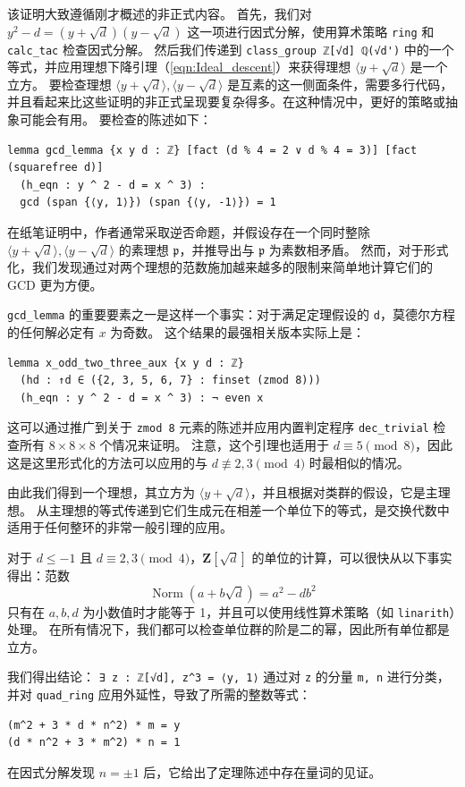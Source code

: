 \documentclass[sigplan,10pt,nonacm,
screen]{acmart} \settopmatter{printfolios=true,printccs=false,printacmref=false}
\newcommand{\ZZ}{\mathbf{Z}}
\DeclareMathOperator{\Norm}{Norm}
\begin{document}
该证明大致遵循刚才概述的非正式内容。
首先，我们对 $y^2 - d = (y + \sqrt{d})(y - \sqrt d)$ 这一项进行因式分解，使用算术策略 \lstinline{ring} 和 \lstinline{calc_tac} 检查因式分解。
%
然后我们传递到 \lstinline{class_group ℤ[√d] ℚ(√d')} 中的一个等式，并应用理想下降引理（\ref{eqn:Ideal_descent}）来获得理想 $\langle y + \sqrt{d} \rangle$ 是一个立方。
要检查理想 $\langle y + \sqrt{d} \rangle,\langle y - \sqrt{d} \rangle$ 是互素的这一侧面条件，需要多行代码，并且看起来比这些证明的非正式呈现要复杂得多。在这种情况中，更好的策略或抽象可能会有用。
要检查的陈述如下：
\begin{lstlisting}
lemma gcd_lemma {x y d : ℤ} [fact (d % 4 = 2 ∨ d % 4 = 3)] [fact (squarefree d)]
  (h_eqn : y ^ 2 - d = x ^ 3) :
  gcd (span {⟨y, 1⟩}) (span {⟨y, -1⟩}) = 1
\end{lstlisting}
在纸笔证明中，作者通常采取逆否命题，并假设存在一个同时整除 $\langle y + \sqrt{d} \rangle,\langle y - \sqrt{d} \rangle$ 的素理想 $\mathfrak p$，并推导出与 $\mathfrak p$ 为素数相矛盾。
然而，对于形式化，我们发现通过对两个理想的范数施加越来越多的限制来简单地计算它们的 GCD 更为方便。

\lstinline{gcd_lemma} 的重要要素之一是这样一个事实：对于满足定理假设的 \lstinline{d}，莫德尔方程的任何解必定有 $x$ 为奇数。
这个结果的最强相关版本实际上是：
\begin{lstlisting}
lemma x_odd_two_three_aux {x y d : ℤ}
  (hd : ↑d ∈ ({2, 3, 5, 6, 7} : finset (zmod 8)))
  (h_eqn : y ^ 2 - d = x ^ 3) : ¬ even x
\end{lstlisting}
这可以通过推广到关于 \lstinline{zmod 8} 元素的陈述并应用内置判定程序 \lstinline{dec_trivial} 检查所有 $8 \times 8 \times 8$ 个情况来证明。
注意，这个引理也适用于 $d \equiv 5 \pmod 8$，因此这是这里形式化的方法可以应用的与 $d \not\equiv 2,3\pmod 4$ 时最相似的情况。

由此我们得到一个理想，其立方为 $\langle y + \sqrt{d} \rangle$，并且根据对类群的假设，它是主理想。
从主理想的等式传递到它们生成元在相差一个单位下的等式，是交换代数中适用于任何整环的非常一般引理的应用。

对于 $d \le -1$ 且 $d\equiv 2,3\pmod 4$，$\ZZ[\sqrt d]$ 的单位的计算，可以很快从以下事实得出：范数
$$\Norm(a+b \sqrt d) = a^2 - d b^2$$
只有在 $a,b,d$ 为小数值时才能等于 1，并且可以使用线性算术策略（如 \lstinline{linarith}）处理。
在所有情况下，我们都可以检查单位群的阶是二的幂，因此所有单位都是立方。

我们得出结论：
\lstinline{∃ z : ℤ[√d], z^3 = ⟨y, 1⟩}
通过对 \lstinline{z} 的分量 \lstinline{m, n} 进行分类，并对 \lstinline{quad_ring} 应用外延性，导致了所需的整数等式：
\begin{lstlisting}
(m^2 + 3 * d * n^2) * m = y
(d * n^2 + 3 * m^2) * n = 1
\end{lstlisting}
在因式分解发现 $n = \pm 1$ 后，它给出了定理陈述中存在量词的见证。
\end{document}
